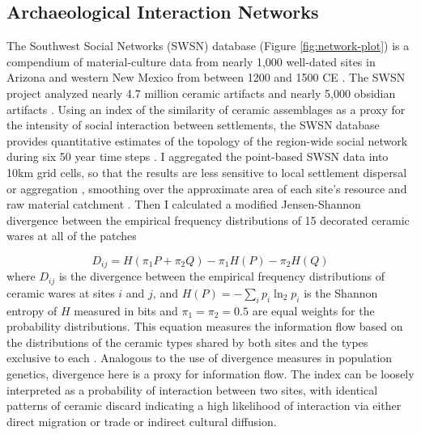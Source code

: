 \documentclass[10pt]{iopart}
\begin{document}
\subsection*{Archaeological Interaction Networks}

The Southwest Social Networks (SWSN) database (Figure \ref{fig:network-plot}) is a compendium of material-culture data from nearly 1,000 well-dated sites in Arizona and western New Mexico from between 1200 and 1500 CE \parencite{Mills2012,Mills2013a,Peeples2013,Borck2015,Hill2015,Mills2015a}. The SWSN project analyzed nearly 4.7 million ceramic artifacts and nearly 5,000 obsidian artifacts \parencite{Mills2015a}. Using an index of the similarity of ceramic assemblages as a proxy for the intensity of social interaction between settlements, the SWSN database provides quantitative estimates of the topology of the region-wide social network during six 50 year time steps \parencite{Mills2013a}. I aggregated the point-based SWSN data into 10km grid cells, so that the results are less sensitive to local settlement dispersal or aggregation \parencite{Paliou2016}, smoothing over the approximate area of each site's resource and raw material catchment \parencite{Varien1999}. Then I calculated a modified Jensen-Shannon divergence between the empirical frequency distributions of 15 decorated ceramic wares at all of the patches

\begin{equation}
    D_{ij} = H\left(\pi_1P + \pi_2Q\right) - \pi_1H(P) - \pi_2H(Q)
\end{equation}
where $D_{ij}$ is the divergence between the empirical frequency distributions of ceramic wares at sites $i$ and $j$, and $H(P) = -\sum_i p_i \ln_2 p_i$ is the Shannon entropy of $H$ measured in bits and $\pi_1 = \pi_2 = 0.5$ are equal weights for the probability distributions. This equation measures the information flow based on the distributions of the ceramic types shared by both sites and the types exclusive to each \parencite{Masucci2011}. Analogous to the use of divergence measures in population genetics, divergence here is a proxy for information flow. The index can be loosely interpreted as a probability of interaction between two sites, with identical patterns of ceramic discard indicating a high likelihood of interaction via either direct migration or trade or indirect cultural diffusion.
\end{document}
